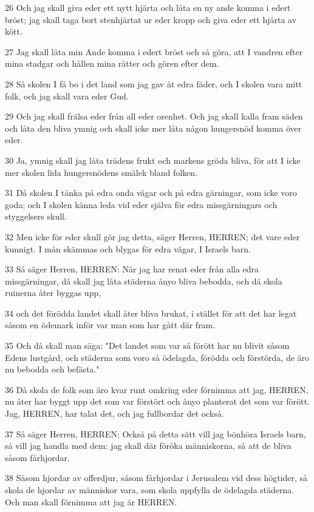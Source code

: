\par 26 Och jag skall giva eder ett nytt hjärta och låta en ny ande komma i edert bröst; jag skall taga bort stenhjärtat ur eder kropp och giva eder ett hjärta av kött.
\par 27 Jag skall låta min Ande komma i edert bröst och så göra, att I vandren efter mina stadgar och hållen mina rätter och gören efter dem.
\par 28 Så skolen I få bo i det land som jag gav åt edra fäder, och I skolen vara mitt folk, och jag skall vara eder Gud.
\par 29 Och jag skall frälsa eder från all eder orenhet. Och jag skall kalla fram säden och låta den bliva ymnig och skall icke mer låta någon hungersnöd komma över eder.
\par 30 Ja, ymnig skall jag låta trädens frukt och markens gröda bliva, för att I icke mer skolen lida hungersnödens smälek bland folken.
\par 31 Då skolen I tänka på edra onda vägar och på edra gärningar, som icke voro goda; och I skolen känna leda vid eder själva för edra missgärningars och styggelsers skull.
\par 32 Men icke för eder skull gör jag detta, säger Herren, HERREN; det vare eder kunnigt. I mån skämmas och blygas för edra vägar, I Israels barn.
\par 33 Så säger Herren, HERREN: När jag har renat eder från alla edra missgärningar, då skall jag låta städerna ånyo bliva bebodda, och då skola ruinerna åter byggas upp,
\par 34 och det förödda landet skall åter bliva brukat, i stället för att det har legat såsom en ödemark inför var man som har gått där fram.
\par 35 Och då skall man säga: "Det landet som var så förött har nu blivit såsom Edens lustgård, och städerna som voro så ödelagda, förödda och förstörda, de äro nu bebodda och befästa."
\par 36 Då skola de folk som äro kvar runt omkring eder förnimma att jag, HERREN, nu åter har byggt upp det som var förstört och ånyo planterat det som var förött. Jag, HERREN, har talat det, och jag fullbordar det också.
\par 37 Så säger Herren, HERREN; Också på detta sätt vill jag bönhöra Israels barn, så vill jag handla med dem: jag skall där föröka människorna, så att de bliva såsom fårhjordar.
\par 38 Såsom hjordar av offerdjur, såsom fårhjordar i Jerusalem vid dess högtider, så skola de hjordar av människor vara, som skola uppfylla de ödelagda städerna. Och man skall förnimma att jag är HERREN.


